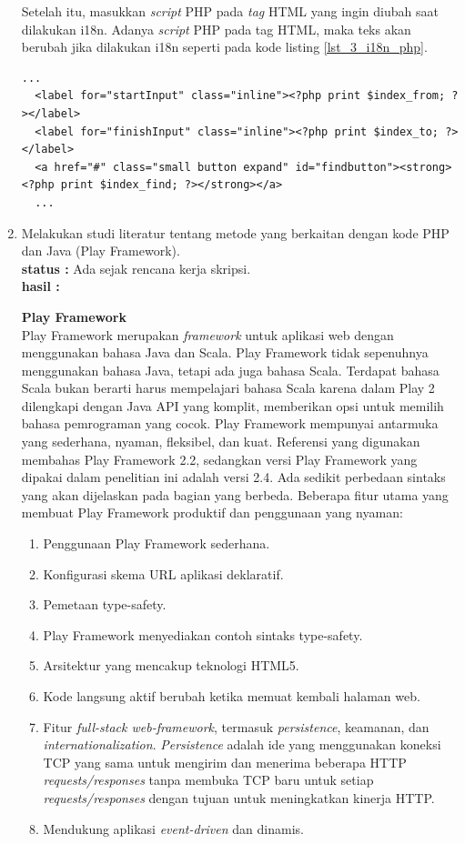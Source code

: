 \documentclass[a4paper,twoside]{article}
\begin{document}
\begin{enumerate}
Setelah itu, masukkan \textit{script} PHP pada \textit{tag} HTML yang ingin diubah saat dilakukan i18n. Adanya \textit{script} PHP pada tag HTML, maka teks akan berubah jika dilakukan i18n seperti pada kode listing \ref{lst_3_i18n_php}.

\begin{lstlisting}[caption=Script PHP untuk Internationalization,label = {lst_3_i18n_php}]
  ...
  <label for="startInput" class="inline"><?php print $index_from; ?></label>
  <label for="finishInput" class="inline"><?php print $index_to; ?></label>
  <a href="#" class="small button expand" id="findbutton"><strong><?php print $index_find; ?></strong></a>
  ...
\end{lstlisting}
    
    
    \item Melakukan studi literatur tentang metode yang berkaitan dengan kode PHP dan Java (Play Framework).\\
    {\bf status :} Ada sejak rencana kerja skripsi.\\
    {\bf hasil :}
    
\textbf{Play Framework}\\
Play Framework \cite{playforjava} merupakan \textit{framework} untuk aplikasi web dengan menggunakan bahasa Java dan Scala. Play Framework tidak sepenuhnya menggunakan bahasa Java, tetapi ada juga bahasa Scala. Terdapat bahasa Scala bukan berarti harus mempelajari bahasa Scala karena dalam Play 2 dilengkapi dengan Java API yang komplit, memberikan opsi untuk memilih bahasa pemrograman yang cocok. Play Framework mempunyai antarmuka yang sederhana, nyaman, fleksibel, dan kuat. Referensi yang digunakan membahas Play Framework 2.2, sedangkan versi Play Framework yang dipakai dalam penelitian ini adalah versi 2.4. Ada sedikit perbedaan sintaks yang akan dijelaskan pada bagian yang berbeda.
Beberapa fitur utama yang membuat Play Framework produktif dan penggunaan yang nyaman:

\begin{enumerate}
  \item Penggunaan Play Framework sederhana.
  \item Konfigurasi skema URL aplikasi deklaratif.
  \item Pemetaan type-safety.
  \item Play Framework menyediakan contoh sintaks type-safety.
  \item Arsitektur yang mencakup teknologi HTML5.
  \item Kode langsung aktif berubah ketika memuat kembali halaman web.
  \item Fitur \textit{full-stack web-framework}, termasuk \textit{persistence}, keamanan, dan \textit{internationalization}. \textit{Persistence} adalah ide yang menggunakan koneksi TCP yang sama untuk mengirim dan menerima beberapa HTTP \textit{requests/responses} tanpa membuka TCP baru untuk setiap \textit{requests/responses} dengan tujuan untuk meningkatkan kinerja HTTP.
  \item Mendukung aplikasi \textit{event-driven} dan dinamis.
\end{enumerate}


\end{enumerate}
\end{document}

